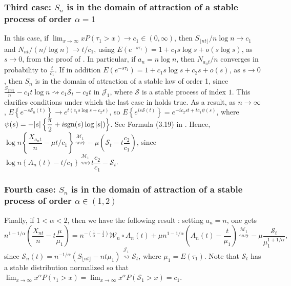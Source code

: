 \documentclass[final]{amsart}
\theoremstyle{definition}
\numberwithin{equation}{section}
\def\disp{\displaystyle}
\newcommand{\cJ}{\ensuremath{\mathcal{J}}}
\newcommand{\cM}{\ensuremath{\mathcal{M}}}
\newcommand{\cS}{\ensuremath{\mathcal{S}}}
\newcommand{\cW}{\ensuremath{\mathcal{W}}}
\def\nt{{\lfloor n t \rfloor}}
\def\nt{{\lfloor n t \rfloor}}
\begin{document}
\subsubsection{Third case: $S_n$ is in the domain of attraction of a stable process of order $\alpha=1$}
In this case, if  $\disp \lim_{x\to\infty}xP(\tau_1>x)\to c_1\in (0,\infty)$, then $S_\nt/n\log{n} \to c_1$ and $N_{nt}/\left(n/\log{n}\right)\to t/c_1$, using   $E\left(e^{-s\tau_1}\right) = 1 + c_1 s\log{s} + o(s\log{s})$, as $s\to 0$, from the proof of \cite[Proposition A.1]{Chavez-Casillas/Elliott/Remillard/Swishchuk:2019}.
In particular, if $a_n = n\log{n}$, then $N_{a_n t}/n$ converges in probability to $\frac{t}{c_1}$. If in addition  $E\left(e^{-s\tau_1}\right) = 1 + c_1 s\log{s}+c_2 s + o(s)$, as $s\to 0$, then  $S_n$ is in the domain of attraction of a stable law of order 1, since
$\frac{S_{\lfloor nt \rfloor}}{n}-c_1 t \log{n} \rightsquigarrow c_1 \cS_t - c_2 t $ in $\cJ_1$,
 where $\cS$ is a stable process of index $1$.
 This clarifies conditions under which the last case in  \cite[Section 4.2.2]{Chavez-Casillas/Elliott/Remillard/Swishchuk:2019} holds true.
 As a result, as $n\to\infty$, $E\left\{e^{-s\cS_n(t)}\right\}\to e^{t\left(c_1 s\log{s}+c_2 s\right)}$, so
$\disp
E\left\{e^{is \cS(t)}\right\} = e^{-ic_2 st +tc_1 \psi(s)}$,
where $\psi(s) = -|s|\left\{\dfrac{\pi}{2} +i{\rm sgn}(s)\log{|s|})\right\}$. See Formula (3.19) in \cite{Feller:1971}. Hence,
$\disp
\log{n}\left\{ \dfrac{X_{a_n t}}{n}-\mu t/c_1\right\} \stackrel{\cM_1}{\rightsquigarrow} -\mu\left(\cS_t -  t \dfrac{c_2}{c_1}\right)$,
since $\log{n}\left\{A_n(t) - t/c_1\right\} \stackrel{\cM_1}{\rightsquigarrow} t \dfrac{c_2}{c_1}-\cS_t $.

\subsubsection{Fourth case: $S_n$ is in the domain of attraction of a stable process of order $\alpha\in (1,2)$}
Finally,  if $1<\alpha<2$, then we have the following result \citep[Theorem 7.4.3]{Whitt:2002}: setting $a_n=n$, one gets
$$
n^{1-1/\alpha} \left(\dfrac{X_{nt}}{n} -t   \dfrac{\mu}{\mu_1}\right) = n^{-\left(\frac{1}{\alpha}-\frac{1}{2}\right)}\cW_n\circ A_n(t) + \mu n^{1-1/\alpha}\left(A_n(t)-\frac{t}{\mu_1}\right)\stackrel{\cM_1}{\rightsquigarrow} - \mu \dfrac{\cS_t}{\mu_1^{1+1/\alpha}},
$$
since $\cS_n(t) = n^{-1/\alpha}\left( S_{\lfloor nt\rfloor} - n t \mu_1\right)\stackrel{\cJ_1}{\rightsquigarrow} \cS_t$, where $\mu_1 = E(\tau_1)$. Note that $\cS_t$ has a stable distribution normalized so that
$\disp \lim_{x\to\infty} x^\alpha P(\tau_1> x) = \lim_{x\to\infty} x^\alpha P(\cS_1> x)= c_1$.
\end{document}
